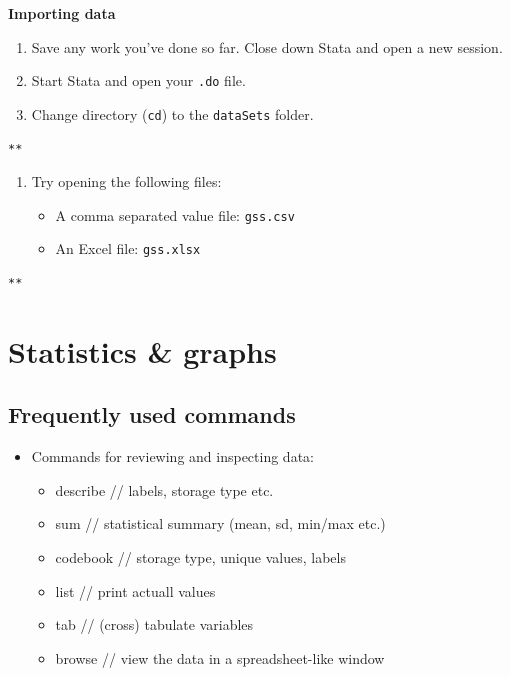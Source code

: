 \documentclass[]{book}
\providecommand{\tightlist}{%
  \setlength{\itemsep}{0pt}\setlength{\parskip}{0pt}}
\begin{document}
\textbf{Importing data}

\begin{enumerate}
\def\labelenumi{\arabic{enumi}.}
\item
  Save any work you've done so far. Close down Stata and open a new session.
\item
  Start Stata and open your \texttt{.do} file.
\item
  Change directory (\texttt{cd}) to the \texttt{dataSets} folder.
\end{enumerate}

\begin{verbatim}
**
\end{verbatim}

\begin{enumerate}
\def\labelenumi{\arabic{enumi}.}
\setcounter{enumi}{3}
\tightlist
\item
  Try opening the following files:

  \begin{itemize}
  \tightlist
  \item
    A comma separated value file: \texttt{gss.csv}
  \item
    An Excel file: \texttt{gss.xlsx}
  \end{itemize}
\end{enumerate}

\begin{verbatim}
**
\end{verbatim}

\hypertarget{statistics-graphs}{%
\section{Statistics \& graphs}\label{statistics-graphs}}

\hypertarget{frequently-used-commands}{%
\subsection{Frequently used commands}\label{frequently-used-commands}}

\begin{itemize}
\tightlist
\item
  Commands for reviewing and inspecting data:

  \begin{itemize}
  \tightlist
  \item
    describe // labels, storage type etc.
  \item
    sum // statistical summary (mean, sd, min/max etc.)
  \item
    codebook // storage type, unique values, labels
  \item
    list // print actuall values
  \item
    tab // (cross) tabulate variables
  \item
    browse // view the data in a spreadsheet-like window
  \end{itemize}
\end{itemize}
\end{document}
